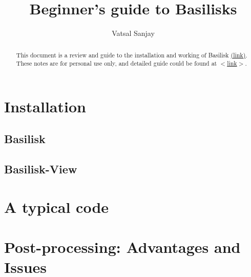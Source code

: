 \documentclass[]{article}
\title{\textbf{Beginner's guide to Basilisks}}
\author{Vatsal Sanjay}
\newcommand\Colorhref[3][blue]{\href{#2}{\color{#1}#3}}
\begin{document}
\maketitle
\begin{abstract}
This document is a review and guide to the installation and working of Basilisk \Colorhref{http://basilisk.fr/}{(link)}. These notes are for personal use only, and detailed guide could be found at \Colorhref{http://basilisk.fr/Tutorial}{$<$link$>$}.
\end{abstract}

\section{Installation}

\subsection{Basilisk}
\subsection{Basilisk-View}
\section{A typical code}
\section{Post-processing: Advantages and Issues}
\end{document}
